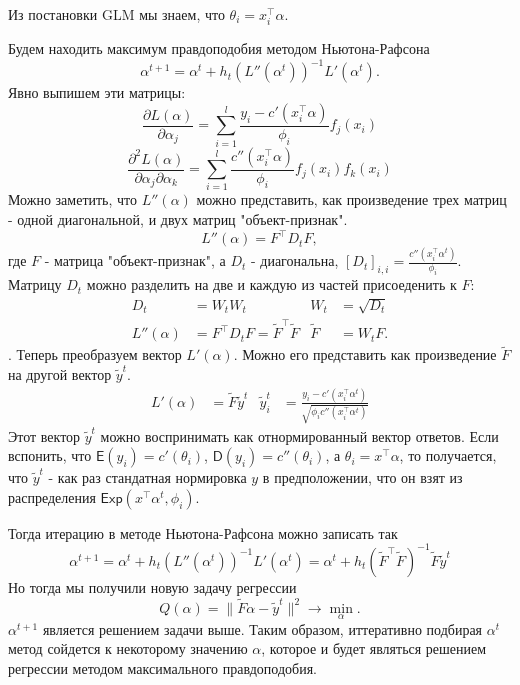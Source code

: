 Из постановки GLM мы знаем, что $\theta_i = x_i^\top\alpha$.

Будем находить максимум правдоподобия методом Ньютона-Рафсона
$$
  \alpha^{t+1} = \alpha^t + h_t \left(L''(\alpha^t)\right)^{-1}L'(\alpha^t).
$$
Явно выпишем эти матрицы:
$$
  \frac{\partial L(\alpha)}{\partial \alpha_j} = \sum_{i=1}^l \frac{y_i - c'(x_i^\top\alpha)}{\phi_i}f_j(x_i)
$$
$$
  \frac{\partial^2 L(\alpha)}{\partial \alpha_j\partial \alpha_k} = \sum_{i=1}^l \frac{c''(x_i^\top\alpha)}{\phi_i}f_j(x_i)f_k(x_i)
$$
Можно заметить, что $L''(\alpha)$ можно представить, как произведение трех матриц - одной диагональной, и двух матриц "объект-признак".
$$
  L''(\alpha) = F^\top D_t F,
$$
где $F$ - матрица "объект-признак", а $D_t$ - диагональна, $[D_t]_{i,i} = \frac{c''(x_i^\top\alpha^t)}{\phi_i}$.
Матрицу $D_t$ можно разделить на две и каждую из частей присоеденить к $F$:
\begin{align*}
  D_t         & = W_t W_t                                        & W_t           & = \sqrt{D_t} \\
  L''(\alpha) & = F^\top D_t F = \widetilde{F}^\top\widetilde{F} & \widetilde{F} & = W_t F.
\end{align*}.
Теперь преобразуем вектор $L'(\alpha)$. Можно его представить как произведение $\widetilde{F}$ на другой вектор $\widetilde{y}^t$.
\begin{align*}
  L'(\alpha) & = \widetilde{F}\widetilde{y}^t & \widetilde{y}^t_i & = \frac{y_i - c'(x_i^\top\alpha^t)}{\sqrt{\phi_i c''(x_i^\top\alpha^t)}}
\end{align*}
Этот вектор $\widetilde{y}^t$ можно воспринимать как отнормированный вектор ответов. Если вспонить, что $\mathsf{E}(y_i) = c'(\theta_i)$, $\mathsf{D}(y_i) = c''(\theta_i)$, а $\theta_i = x^\top \alpha$, то получается, что $\widetilde{y}^t$ - как раз стандатная нормировка $y$ в предположении, что он взят из распределения $\mathsf{Exp}(x^\top \alpha^t, \phi_i)$.

Тогда итерацию в методе Ньютона-Рафсона можно записать так
$$
  \alpha^{t+1} = \alpha^t + h_t \left(L''(\alpha^t)\right)^{-1}L'(\alpha^t) =
  \alpha^t + h_t \left(\widetilde{F}^\top\widetilde{F}\right)^{-1}\widetilde{F}\widetilde{y}^t
$$
Но тогда мы получили новую задачу регрессии
$$
  Q(\alpha) = \|\widetilde{F} \alpha - \widetilde{y}^t\|^2 \to \min_{\alpha}.
$$
$\alpha^{t+1}$ является решением задачи выше. Таким образом, иттеративно подбирая $\alpha^t$ метод сойдется к некоторому значению $\alpha$, которое и будет являться решением регрессии методом максимального правдоподобия.

